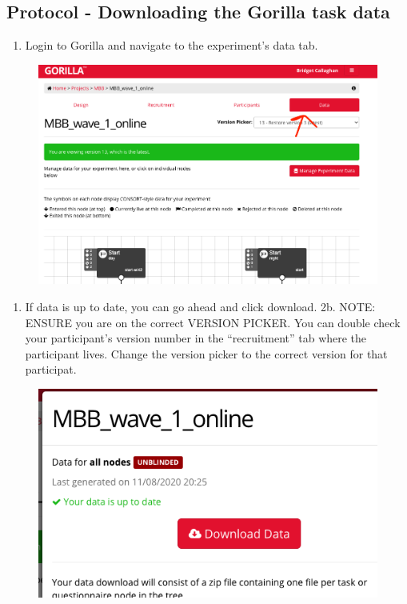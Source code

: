 \documentclass[]{book}
\providecommand{\tightlist}{%
  \setlength{\itemsep}{0pt}\setlength{\parskip}{0pt}}
\begin{document}
\hypertarget{protocol---downloading-the-gorilla-task-data}{%
\subsection{Protocol - Downloading the Gorilla task data}\label{protocol---downloading-the-gorilla-task-data}}

\begin{enumerate}
\def\labelenumi{\arabic{enumi}.}
\tightlist
\item
  Login to Gorilla and navigate to the experiment's data tab.
\end{enumerate}

\begin{figure}
\centering
\includegraphics{images/gorilla/6.png}
\caption{}
\end{figure}

\begin{enumerate}
\def\labelenumi{\arabic{enumi}.}
\setcounter{enumi}{1}
\tightlist
\item
  If data is up to date, you can go ahead and click download.
  2b. NOTE: ENSURE you are on the correct VERSION PICKER. You can double check your participant's version number in the ``recruitment'' tab where the participant lives. Change the version picker to the correct version for that participat.
\end{enumerate}

\begin{figure}
\centering
\includegraphics{images/gorilla/7.png}
\caption{}
\end{figure}
\end{document}
